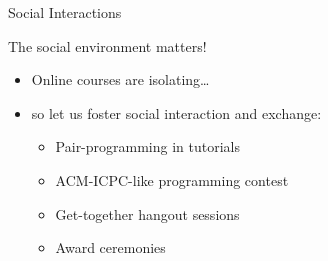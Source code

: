 \documentclass{beamer}
\begin{document}

\begin{frame}{Social Interactions}
\centerline{\Large{\alert{The social environment matters!}}}
\pause
\begin{itemize}[<+->]
\item Online courses are isolating\dots
\item[] so let us foster social interaction and exchange:
\begin{itemize}[<4->]
  \item Pair-programming in tutorials
  \item ACM-ICPC-like programming contest
  \item Get-together hangout sessions
  \item Award ceremonies
\end{itemize}
\end{itemize}
\end{frame}



\end{document}
